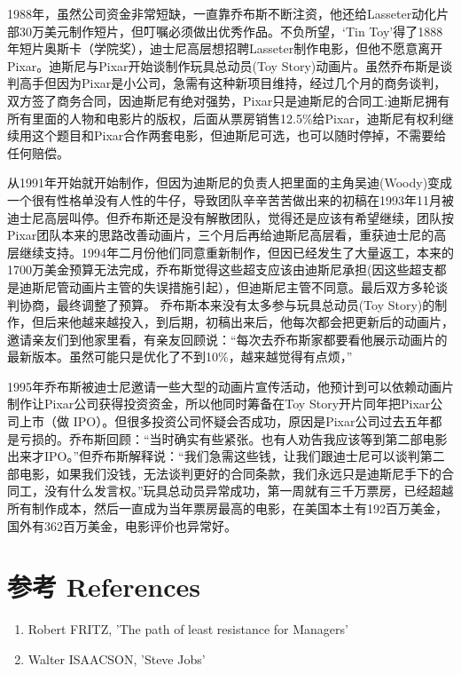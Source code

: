 1988年，虽然公司资金非常短缺，一直靠乔布斯不断注资，他还给Lasseter动化片部30万美元制作短片，但叮嘱必须做出优秀作品。不负所望，`Tin
Toy'得了1888
年短片奥斯卡（学院奖），迪士尼高层想招聘Lasseter制作电影，但他不愿意离开Pixar。迪斯尼与Pixar开始谈制作玩具总动员(Toy
Story)动画片。虽然乔布斯是谈判高手但因为Pixar是小公司，急需有这种新项目维持，经过几个月的商务谈判，双方签了商务合同，因迪斯尼有绝对强势，Pixar只是迪斯尼的合同工:迪斯尼拥有所有里面的人物和电影片的版权，后面从票房销售12.5\%给Pixar，迪斯尼有权利继续用这个题目和Pixar合作两套电影，但迪斯尼可选，也可以随时停掉，不需要给任何赔偿。

从1991年开始就开始制作，但因为迪斯尼的负责人把里面的主角吴迪(Woody)变成一个很有性格单没有人性的牛仔，导致团队辛辛苦苦做出来的初稿在1993年11月被迪士尼高层叫停。但乔布斯还是没有解散团队，觉得还是应该有希望继续，团队按Pixar团队本来的思路改善动画片，三个月后再给迪斯尼高层看，重获迪士尼的高层继续支持。1994年二月份他们同意重新制作，但因已经发生了大量返工，本来的1700万美金预算无法完成，乔布斯觉得这些超支应该由迪斯尼承担(因这些超支都是迪斯尼管动画片主管的失误措施引起），但迪斯尼主管不同意。最后双方多轮谈判协商，最终调整了预算。
乔布斯本来没有太多参与玩具总动员(Toy
Story)的制作，但后来他越来越投入，到后期，初稿出来后，他每次都会把更新后的动画片，邀请亲友们到他家里看，有亲友回顾说：``每次去乔布斯家都要看他展示动画片的最新版本。虽然可能只是优化了不到10\%，越来越觉得有点烦，''

1995年乔布斯被迪士尼邀请一些大型的动画片宣传活动，他预计到可以依赖动画片制作让Pixar公司获得投资资金，所以他同时筹备在Toy
Story开片同年把Pixar公司上市（做
IPO）。但很多投资公司怀疑会否成功，原因是Pixar公司过去五年都是亏损的。乔布斯回顾：``当时确实有些紧张。也有人劝告我应该等到第二部电影出来才IPO。''但乔布斯解释说：``我们急需这些钱，让我们跟迪士尼可以谈判第二部电影，如果我们没钱，无法谈判更好的合同条款，我们永远只是迪斯尼手下的合同工，没有什么发言权。''玩具总动员异常成功，第一周就有三千万票房，已经超越所有制作成本，然后一直成为当年票房最高的电影，在美国本土有192百万美金，国外有362百万美金，电影评价也异常好。

\hypertarget{ux9644ux4ef6}{%
\section{参考 References}\label{ux9644ux4ef6}}

\begin{enumerate}
\tightlist
\item
  Robert FRITZ, 'The path of least resistance for Managers'
\item
  Walter ISAACSON, 'Steve Jobs'
\end{enumerate}




